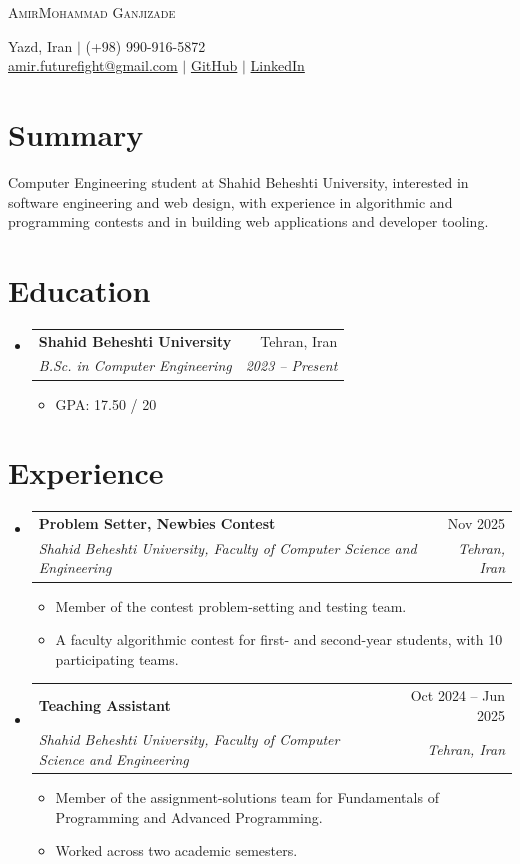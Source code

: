 \documentclass[letterpaper,11pt]{article}
\makeatletter
\newcommand{\resumeItem}[1]{
  \item\small{\color{Charcoal} #1 \vspace{-2pt}}
}
\newcommand{\resumeSubheading}[4]{
  \vspace{-1pt}\item
    \begin{tabular*}{\linewidth}[t]{l@{\extracolsep{\fill}}r}
      \textbf{\color{Charcoal}#1} & \small\color{Charcoal}#2 \\
      \textit{\small\color{Charcoal}#3} & \textit{\small\color{Charcoal}#4} \\
    \end{tabular*}\par\vspace{-5pt}
}
\newcommand{\resumeSubHeadingListStart}{\begin{itemize}[leftmargin=0.15in, label={}]}
\newcommand{\resumeSubHeadingListEnd}{\end{itemize}}
\newcommand{\resumeItemListStart}{\begin{itemize}}
\newcommand{\resumeItemListEnd}{\end{itemize}\vspace{-4pt}}
\makeatother
\begin{document}
\begin{center}
    {\Huge \scshape \color{DeepNavy} AmirMohammad Ganjizade} \\ \vspace{4pt}

    \small \color{Charcoal}
    Yazd, Iran $|$ (+98) 990-916-5872 \\
    \href{mailto:amir.futurefight@gmail.com}{\color{DeepNavy}amir.futurefight@gmail.com} $|$
    \href{https://github.com/AmirGjzh}{\color{DeepNavy}GitHub} $|$
    \href{https://www.linkedin.com/in/amirmohammad-ganjizade-466673202}{\color{DeepNavy}LinkedIn}
\end{center}

\section{Summary}
\small{\color{Charcoal}
Computer Engineering student at Shahid Beheshti University, interested in software engineering and web design, with experience in algorithmic and programming contests and in building web applications and developer tooling.
}

\section{Education}
\resumeSubHeadingListStart
  \resumeSubheading
    {Shahid Beheshti University}{Tehran, Iran}
    {B.Sc. in Computer Engineering}{2023 -- Present}
    \resumeItemListStart
      \resumeItem{GPA: 17.50 / 20}
    \resumeItemListEnd
\resumeSubHeadingListEnd\vspace{3pt}

\section{Experience}
\resumeSubHeadingListStart
  \resumeSubheading
    {Problem Setter, Newbies Contest}{Nov 2025}
    {Shahid Beheshti University, Faculty of Computer Science and Engineering}{Tehran, Iran}
    \resumeItemListStart
      \resumeItem{Member of the contest problem-setting and testing team.}
      \resumeItem{A faculty algorithmic contest for first- and second-year students, with 10 participating teams.}
    \resumeItemListEnd

  \resumeSubheading
    {Teaching Assistant}{Oct 2024 -- Jun 2025}
    {Shahid Beheshti University, Faculty of Computer Science and Engineering}{Tehran, Iran}
    \resumeItemListStart
      \resumeItem{Member of the assignment-solutions team for Fundamentals of Programming and Advanced Programming.}
      \resumeItem{Worked across two academic semesters.}
    \resumeItemListEnd
\resumeSubHeadingListEnd
\end{document}
